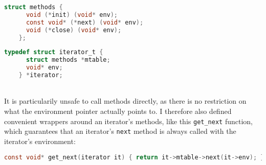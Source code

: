 \documentclass[11pt]{article}
\def\ce{\lstinline[language=C, breaklines=true, columns=fixed]}
\begin{document}
\noindent\begin{minipage}{.45\textwidth}
  \begin{lstlisting}[language=C, basicstyle=\small]
    struct methods {
      void (*init) (void* env);
      const void* (*next) (void* env);
      void (*close) (void* env);
    };
\end{lstlisting}\end{minipage}\hfill
\begin{minipage}{.45\textwidth}
  \begin{lstlisting}[language=C, basicstyle=\small]
    typedef struct iterator_t {
      struct methods *mtable;
      void* env;
    } *iterator;
  \end{lstlisting}
\end{minipage}\\

It is particularily unsafe to call methods directly, as there is no restriction on what the environment pointer actually points to.
I therefore also defined convenient wrappers around an iterator's methods, like this \ce{get_next} function, which guarantees that
an iterator's \ce{next} method is always called with the iterator's environment:
\begin{lstlisting}[language=C, basicstyle=\small]
  const void* get_next(iterator it) { return it->mtable->next(it->env); };
\end{lstlisting}
\end{document}
